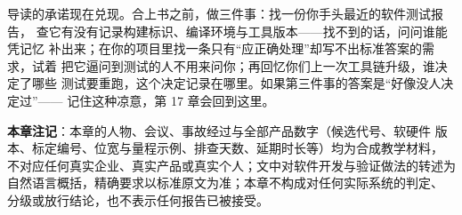 导读的承诺现在兑现。合上书之前，做三件事：找一份你手头最近的软件测试报告，
查它有没有记录构建标识、编译环境与工具版本——找不到的话，问问谁能凭记忆
补出来；在你的项目里找一条只有“应正确处理”却写不出标准答案的需求，试着
把它逼问到测试的人不用来问你；再回忆你们上一次工具链升级，谁决定了哪些
测试要重跑，这个决定记录在哪里。如果第三件事的答案是“好像没人决定过”——
记住这种凉意，第 17 章会回到这里。


\begin{noteblock}
\textbf{本章注记}：本章的人物、会议、事故经过与全部产品数字（候选代号、软硬件
版本、标定编号、位宽与量程示例、排查天数、延期时长等）均为合成教学材料，
不对应任何真实企业、真实产品或真实个人；文中对软件开发与验证做法的转述为
自然语言概括，精确要求以标准原文为准；本章不构成对任何实际系统的判定、
分级或放行结论，也不表示任何报告已被接受。
\end{noteblock}
